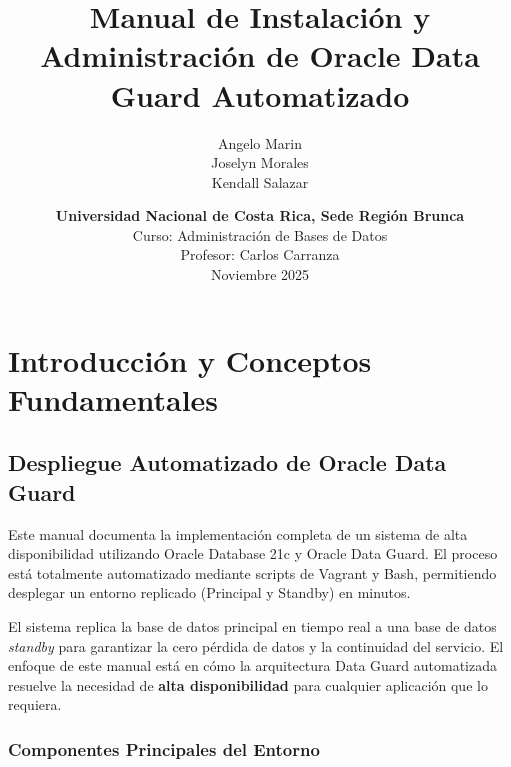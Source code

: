 \documentclass[11pt, a4paper]{report}
\title{\textbf{Manual de Instalación y Administración de Oracle Data Guard Automatizado}}
\author{
    Angelo Marin \\
    Joselyn Morales \\
    Kendall Salazar
}
\date{
    \textbf{Universidad Nacional de Costa Rica, Sede Región Brunca} \\
    \vspace{0.5em}
    Curso: Administración de Bases de Datos \\
    Profesor: Carlos Carranza \\
    \vspace{0.5em}
    Noviembre 2025
}
\begin{document}
\maketitle
\tableofcontents
\newpage


\chapter{Introducción y Conceptos Fundamentales}

\section{Despliegue Automatizado de Oracle Data Guard}

Este manual documenta la implementación completa de un sistema de alta disponibilidad utilizando Oracle Database 21c y Oracle Data Guard. El proceso está totalmente automatizado mediante scripts de Vagrant y Bash, permitiendo desplegar un entorno replicado (Principal y Standby) en minutos.

El sistema replica la base de datos principal en tiempo real a una base de datos \textit{standby} para garantizar la cero pérdida de datos y la continuidad del servicio. El enfoque de este manual está en cómo la arquitectura Data Guard automatizada resuelve la necesidad de \textbf{alta disponibilidad} para cualquier aplicación que lo requiera.

\subsection{Componentes Principales del Entorno}
\end{document}
